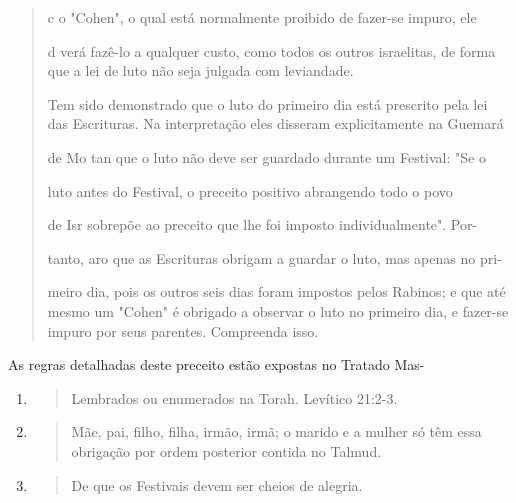 \begin{quote}
c o "Cohen", o qual está normalmente proibido de fazer-se impuro, ele

d verá fazê-lo a qualquer custo, como todos os outros israelitas, de
forma que a lei de luto não seja julgada com leviandade.

Tem sido demonstrado que o luto do primeiro dia está prescrito pe­la lei
das Escrituras. Na interpretação eles disseram explicitamente na Guemará

de Mo tan que o luto não deve ser guardado durante um Festival: "Se o

luto antes do Festival, o preceito positivo abrangendo todo o povo

de Isr sobrepõe ao preceito que lhe foi imposto individualmente". Por-

tanto, aro que as Escrituras obrigam a guardar o luto, mas apenas no
pri-

meiro dia, pois os outros seis dias foram impostos pelos Rabinos; e que
até mes­mo um "Cohen" é obrigado a observar o luto no primeiro dia, e
fazer-se impu­ro por seus parentes. Compreenda isso.
\end{quote}

As regras detalhadas deste preceito estão expostas no Tratado Mas-

\begin{enumerate}
\def\labelenumi{\arabic{enumi}.}
\setcounter{enumi}{60}
\item
 \begin{quote}
 Lembrados ou enumerados na Torah. Levítico 21:2-3.
 \end{quote}
\item
 \begin{quote}
 Mãe, pai, filho, filha, irmão, irmã; o marido e a mulher só têm essa
 obrigação por ordem poste­rior contida no Talmud.
 \end{quote}
\item
 \begin{quote}
 De que os Festivais devem ser cheios de alegria.
 \end{quote}
\end{enumerate}

